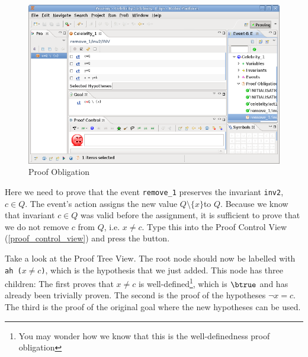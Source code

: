 \begin{figure}[!ht]
\begin{center}
	\includegraphics{img/tutorial/tut_08_proof2.png}
	\caption{Proof Obligation}
	\label{fig_tut_08_proof_obligation}
\end{center}
\end{figure}


Here we need to prove that the event \texttt{remove\_1} preserves the invariant \texttt{inv2},
  $c\in Q$.
The event's action assigns the new value $Q\setminus \{x\} $to $Q$.
Because we know that invariant $c\in Q$ was valid before the assignment, 
 it is sufficient to prove that we do not remove $c$ from $Q$, i.e. \textsf{$x \neq c$}. Type this into the \textsf{Proof Control View} (\ref{proof_control_view}) and press the \textsf{ button}. 


Take a look at the Proof Tree View. The root node should now be labelled with \texttt{ah ($x\neq c$)},
  which is the hypothesis that we just added.
This node has three children: The first proves that $x\neq c$ is well-defined\footnote{You may wonder how we know that this is the well-definedness proof obligation}, which is $\btrue$ and has already been trivially proven.
The second is the proof of the hypotheses $\lnot x=c$.
The third is the proof of the original goal where the new hypotheses can be used.

